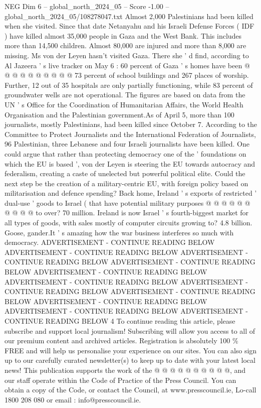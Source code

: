 \begin{textsample}{NEG Dim 6 – global\_north\_2024\_05 – Score -1.00 – global\_north\_2024\_05/108278047.txt}
Almost 2,000 Palestinians had been killed when she visited.
Since that date Netanyahu and his Israeli Defense Forces ( IDF ) have killed almost 35,000 people in Gaza and the West Bank.
This includes more than 14,500 children.
Almost 80,000 are injured and more than 8,000 are missing.
Ms von der Leyen hasn't visited Gaza.
There she ' d find, according to Al Jazeera ' s live tracker on May 6 : 60 percent of Gaza ' s homes have been @ @ @ @ @ @ @ @ @ @ 73 percent of school buildings and 267 places of worship.
Further, 12 out of 35 hospitals are only partially functioning, while 83 percent of groundwater wells are not operational.
The figures are based on data from the UN ' s Office for the Coordination of Humanitarian Affairs, the World Health Organisation and the Palestinian government.As of April 5, more than 100 journalists, mostly Palestinians, had been killed since October 7.
According to the Committee to Protect Journalists and the International Federation of Journalists, 96 Palestinian, three Lebanese and four Israeli journalists have been killed.
One could argue that rather than protecting democracy one of the ' foundations on which the EU is based ', von der Leyen is steering the EU towards autocracy and federalism, creating a caste of unelected but powerful political elite.
Could the next step be the creation of a military-centric EU, with foreign policy based on militarisation and defence spending?
Back home, Ireland ' s exports of restricted ' dual-use ' goods to Israel ( that have potential military purposes @ @ @ @ @ @ @ @ @ @ to over? 70 million.
Ireland is now Israel ' s fourth-biggest market for all types of goods, with sales mostly of computer circuits growing to? 4.8 billion.
Goose, gander.It ' s amazing how the war business interferes so much with democracy.
ADVERTISEMENT - CONTINUE READING BELOW ADVERTISEMENT - CONTINUE READING BELOW ADVERTISEMENT - CONTINUE READING BELOW ADVERTISEMENT - CONTINUE READING BELOW ADVERTISEMENT - CONTINUE READING BELOW ADVERTISEMENT - CONTINUE READING BELOW ADVERTISEMENT - CONTINUE READING BELOW ADVERTISEMENT - CONTINUE READING BELOW ADVERTISEMENT - CONTINUE READING BELOW ADVERTISEMENT - CONTINUE READING BELOW ADVERTISEMENT - CONTINUE READING BELOW 4 To continue reading this article, please subscribe and support local journalism!
Subscribing will allow you access to all of our premium content and archived articles.
Registration is absolutely 100 \% FREE and will help us personalise your experience on our sites.
You can also sign up to our carefully curated newsletter(s) to keep up to date with your latest local news!
This publication supports the work of the @ @ @ @ @ @ @ @ @ @, and our staff operate within the Code of Practice of the Press Council.
You can obtain a copy of the Code, or contact the Council, at www.presscouncil.ie, Lo-call 1800 208 080 or email : info@presscouncil.ie.

\end{textsample}
